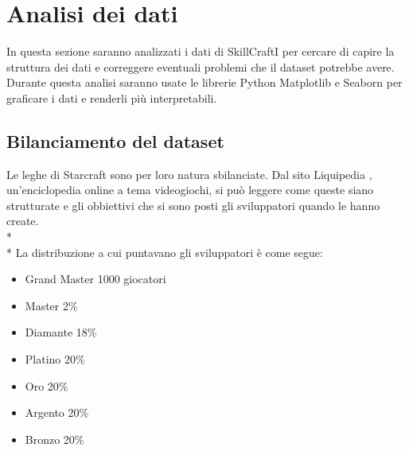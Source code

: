 \section{Analisi dei dati}\label{sec:analisi}
\normalsize
In questa sezione saranno analizzati i dati di SkillCraftI \cite{SkillCraft} per cercare di capire la struttura dei dati e correggere eventuali problemi che il dataset potrebbe avere. Durante questa analisi saranno usate le librerie Python Matplotlib e Seaborn per graficare i dati e renderli più interpretabili.   
\subsection{Bilanciamento del dataset}\label{ssec:bilanciamento}
\normalsize
\par
Le leghe di Starcraft sono per loro natura sbilanciate.
Dal sito Liquipedia \cite{liquipedia}, un'enciclopedia online a tema videogiochi, si può leggere come queste siano strutturate e gli obbiettivi che si sono posti gli sviluppatori quando le hanno create. \\*\\*
La distribuzione a cui puntavano gli sviluppatori è come segue: 
\begin{itemize}
	\item Grand Master 1000 giocatori
	\item Master 2\%
	\item Diamante 18\%
	\item Platino 20\%
	\item Oro 20\%
	\item Argento 20\% 
	\item Bronzo 20\%
\end{itemize}

